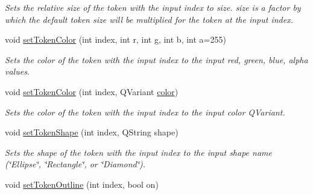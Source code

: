 \begin{DoxyCompactItemize}
\begin{DoxyCompactList}\small\item\em Sets the relative size of the token with the input index to size. size is a factor by which the default token size will be multiplied for the token at the input index. \end{DoxyCompactList}\item 
\hypertarget{class_picto_1_1_token_factory_graphic_a2192ff428146627cd30dab0257d0a181}{void \hyperlink{class_picto_1_1_token_factory_graphic_a2192ff428146627cd30dab0257d0a181}{set\-Token\-Color} (int index, int r, int g, int b, int a=255)}\label{class_picto_1_1_token_factory_graphic_a2192ff428146627cd30dab0257d0a181}

\begin{DoxyCompactList}\small\item\em Sets the color of the token with the input index to the input red, green, blue, alpha values. \end{DoxyCompactList}\item 
\hypertarget{class_picto_1_1_token_factory_graphic_a75573001aa81ab14dc8b26c314a95055}{void \hyperlink{class_picto_1_1_token_factory_graphic_a75573001aa81ab14dc8b26c314a95055}{set\-Token\-Color} (int index, Q\-Variant \hyperlink{struct_picto_1_1_visual_element_a45c3042c969717eb2ab60373369c7de7}{color})}\label{class_picto_1_1_token_factory_graphic_a75573001aa81ab14dc8b26c314a95055}

\begin{DoxyCompactList}\small\item\em Sets the color of the token with the input index to the input color Q\-Variant. \end{DoxyCompactList}\item 
\hypertarget{class_picto_1_1_token_factory_graphic_a0f268ec453469be8a8c2517d7074b967}{void \hyperlink{class_picto_1_1_token_factory_graphic_a0f268ec453469be8a8c2517d7074b967}{set\-Token\-Shape} (int index, Q\-String shape)}\label{class_picto_1_1_token_factory_graphic_a0f268ec453469be8a8c2517d7074b967}

\begin{DoxyCompactList}\small\item\em Sets the shape of the token with the input index to the input shape name (\char`\"{}\-Ellipse\char`\"{}, \char`\"{}\-Rectangle\char`\"{}, or \char`\"{}\-Diamond\char`\"{}). \end{DoxyCompactList}\item 
\hypertarget{class_picto_1_1_token_factory_graphic_afbc1948e0c20bb5a3c90ad50672e9add}{void \hyperlink{class_picto_1_1_token_factory_graphic_afbc1948e0c20bb5a3c90ad50672e9add}{set\-Token\-Outline} (int index, bool on)}\label{class_picto_1_1_token_factory_graphic_afbc1948e0c20bb5a3c90ad50672e9add}


\end{DoxyCompactItemize}
